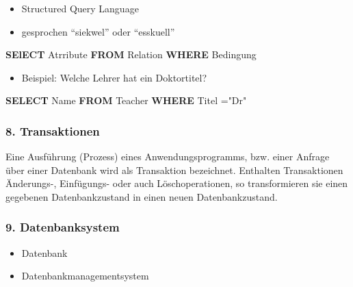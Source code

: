 \documentclass[
  11pt,
  a4paper,
  DIV=11,
  numbers=noendperiod]{scrartcl}
\newenvironment{Shaded}{\begin{snugshade}}{\end{snugshade}}
\newcommand{\KeywordTok}[1]{\textcolor[rgb]{0.00,0.23,0.31}{\textbf{#1}}}
\newcommand{\NormalTok}[1]{\textcolor[rgb]{0.00,0.23,0.31}{#1}}
\newcommand{\OperatorTok}[1]{\textcolor[rgb]{0.37,0.37,0.37}{#1}}
\newcommand{\OtherTok}[1]{\textcolor[rgb]{0.00,0.23,0.31}{#1}}
\providecommand{\tightlist}{%
  \setlength{\itemsep}{0pt}\setlength{\parskip}{0pt}}\usepackage{longtable,booktabs,array}
\begin{document}
\begin{itemize}
\tightlist
\item
  Structured Query Language
\item
  gesprochen ``siekwel'' oder ``esskuell''
\end{itemize}

\begin{Shaded}
\begin{Highlighting}[numbers=left,,]
\KeywordTok{SElECT}\NormalTok{ Atrribute}
\KeywordTok{FROM}\NormalTok{ Relation }
\KeywordTok{WHERE}\NormalTok{ Bedingung}
\end{Highlighting}
\end{Shaded}

\begin{itemize}
\tightlist
\item
  Beispiel: Welche Lehrer hat ein Doktortitel?
\end{itemize}

\begin{Shaded}
\begin{Highlighting}[numbers=left,,]
\KeywordTok{SELECT}\NormalTok{ Name}
\KeywordTok{FROM}\NormalTok{  Teacher}
\KeywordTok{WHERE}\NormalTok{ Titel }\OperatorTok{=}\OtherTok{"Dr"}
\end{Highlighting}
\end{Shaded}

\subsubsection{8. Transaktionen}\label{transaktionen}

Eine Ausführung (Prozess) eines Anwendungsprogramms, bzw. einer Anfrage
über einer Datenbank wird als Transaktion bezeichnet. Enthalten
Transaktionen Änderungs-, Einfügungs- oder auch Löschoperationen, so
transformieren sie einen gegebenen Datenbankzustand in einen neuen
Datenbankzustand.

\subsubsection{9. Datenbanksystem}\label{datenbanksystem}

\begin{itemize}
\tightlist
\item
  Datenbank
\item
  Datenbankmanagementsystem
\end{itemize}
\end{document}
